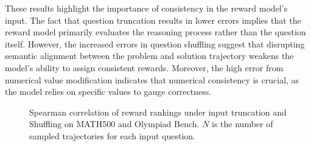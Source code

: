 \documentclass{article}
\begin{document}
These results highlight the importance of consistency in the reward model’s input. The fact that question truncation results in lower errors implies that the reward model primarily evaluates the reasoning process rather than the question itself. However, the increased errors in question shuffling suggest that disrupting semantic alignment between the problem and solution trajectory weakens the model's ability to assign consistent rewards. Moreover, the high error from numerical value modification indicates that numerical consistency is crucial, as the model relies on specific values to gauge correctness.

\begin{figure}[t]
    \centering
    
    
    \caption{Spearman correlation of reward rankings under input truncation and Shuffling on MATH500 and Olympiad Bench. $N$ is the number of sampled trajectories for each input question.}
    \label{fig:coeff}
\end{figure}
\end{document}
